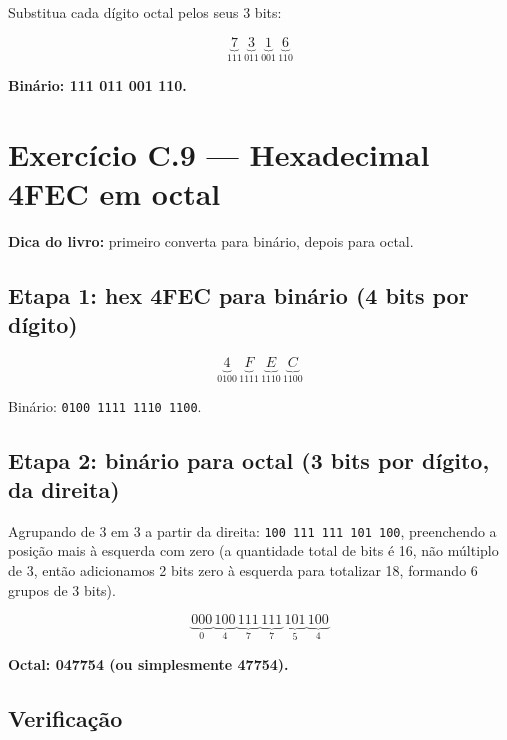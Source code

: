 \documentclass[11pt,a4paper]{article}
\begin{document}
Substitua cada d\'igito octal pelos seus 3 bits:

\[
\underbrace{7}_{111} \, \underbrace{3}_{011} \, \underbrace{1}_{001} \, \underbrace{6}_{110}
\]

\begin{resposta}\textbf{Bin\'ario: 111 011 001 110.}\end{resposta}

\section{Exerc\'icio C.9 --- Hexadecimal 4FEC em octal}

\textbf{Dica do livro:} primeiro converta para bin\'ario, depois para octal.

\subsection*{Etapa 1: hex 4FEC para bin\'ario (4 bits por d\'igito)}

\[
\underbrace{4}_{0100} \, \underbrace{F}_{1111} \, \underbrace{E}_{1110} \, \underbrace{C}_{1100}
\]

Bin\'ario: \texttt{0100 1111 1110 1100}.

\subsection*{Etapa 2: bin\'ario para octal (3 bits por d\'igito, da direita)}

Agrupando de 3 em 3 a partir da direita: \texttt{100 111 111 101 100}, preenchendo a posi\c{c}\~ao mais \`a esquerda com zero (a quantidade total de bits \'e 16, n\~ao m\'ultiplo de 3, ent\~ao adicionamos 2 bits zero \`a esquerda para totalizar 18, formando 6 grupos de 3 bits).

\[
\underbrace{000}_{0} \, \underbrace{100}_{4} \, \underbrace{111}_{7} \, \underbrace{111}_{7} \, \underbrace{101}_{5} \, \underbrace{100}_{4}
\]

\begin{resposta}\textbf{Octal: 047754 (ou simplesmente 47754).}\end{resposta}

\subsection*{Verifica\c{c}\~ao}
\end{document}
